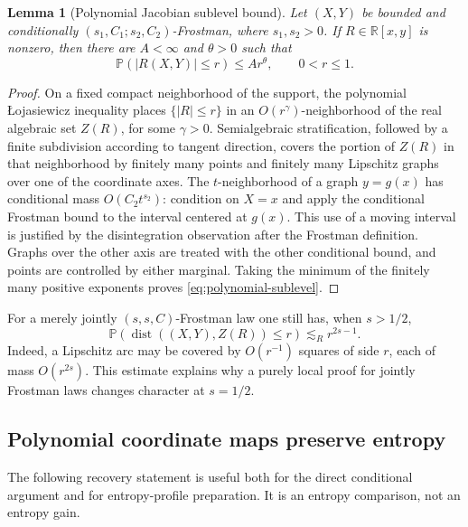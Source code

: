 \documentclass[11pt]{article}
\newtheorem{lemma}[theorem]{Lemma}
\begin{document}
\begin{lemma}[Polynomial Jacobian sublevel bound]
\label{lem:polynomial-sublevel}
Let \((X,Y)\) be bounded and conditionally
\((s_1,C_1;s_2,C_2)\)-Frostman, where \(s_1,s_2>0\).  If
\(R\in\mathbb R[x,y]\) is nonzero, then there are \(A<\infty\) and
\(\theta>0\) such that
\begin{equation}
 \mathbb P(|R(X,Y)|\le r)\le Ar^\theta,
 \qquad 0<r\le1.
 \label{eq:polynomial-sublevel}
\end{equation}
\end{lemma}

\begin{proof}
On a fixed compact neighborhood of the support, the polynomial
{\L}ojasiewicz inequality
{\cite[Corollary~2.6.7]{BCR}}
places \(\{|R|\le r\}\) in an
\(O(r^\gamma)\)-neighborhood of the real algebraic set \(Z(R)\),
for some \(\gamma>0\).  Semialgebraic stratification, followed by a
finite subdivision according to tangent direction, covers the
portion of \(Z(R)\) in that neighborhood by finitely many points and
finitely many Lipschitz graphs over one of the coordinate axes.
The \(t\)-neighborhood of a graph \(y=g(x)\) has conditional mass
\(O(C_2t^{s_2})\): condition on \(X=x\) and apply the conditional
Frostman bound to the interval centered at \(g(x)\).  This use of a
moving interval is justified by the disintegration observation after
the Frostman definition.  Graphs over the
other axis are treated with the other conditional bound, and points
are controlled by either marginal.  Taking the minimum of the
finitely many positive exponents proves \eqref{eq:polynomial-sublevel}.
\end{proof}

For a merely jointly \((s,s,C)\)-Frostman law one still has, when
\(s>1/2\),
\begin{equation}
 \mathbb P(\operatorname{dist}((X,Y),Z(R))\le r)\lesssim_R r^{2s-1}.
 \label{eq:joint-tube}
\end{equation}
Indeed, a Lipschitz arc may be covered by \(O(r^{-1})\) squares of
side \(r\), each of mass \(O(r^{2s})\).  This estimate explains why
a purely local proof for jointly Frostman laws changes character at
\(s=1/2\).

\subsection{Polynomial coordinate maps preserve entropy}

The following recovery statement is useful both for the direct
conditional argument and for entropy-profile preparation.  It is an
entropy comparison, not an entropy gain.
\end{document}
